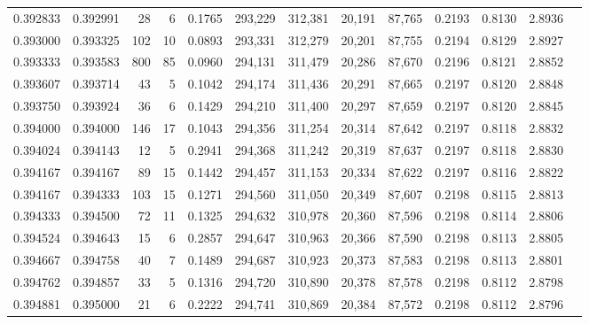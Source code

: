 \begin{tabular}{rrrrrrrrrrrrr}
0.392833 & 0.392991 &    28 &   6 &                                     0.1765 & 293,229 & 312,381 &  20,191 &  87,765 & 0.2193 & 0.8130 & 2.8936 \\
0.393000 & 0.393325 &   102 &  10 &                                     0.0893 & 293,331 & 312,279 &  20,201 &  87,755 & 0.2194 & 0.8129 & 2.8927 \\
0.393333 & 0.393583 &   800 &  85 &                                     0.0960 & 294,131 & 311,479 &  20,286 &  87,670 & 0.2196 & 0.8121 & 2.8852 \\
0.393607 & 0.393714 &    43 &   5 &                                     0.1042 & 294,174 & 311,436 &  20,291 &  87,665 & 0.2197 & 0.8120 & 2.8848 \\
0.393750 & 0.393924 &    36 &   6 &                                     0.1429 & 294,210 & 311,400 &  20,297 &  87,659 & 0.2197 & 0.8120 & 2.8845 \\
0.394000 & 0.394000 &   146 &  17 &                                     0.1043 & 294,356 & 311,254 &  20,314 &  87,642 & 0.2197 & 0.8118 & 2.8832 \\
0.394024 & 0.394143 &    12 &   5 &                                     0.2941 & 294,368 & 311,242 &  20,319 &  87,637 & 0.2197 & 0.8118 & 2.8830 \\
0.394167 & 0.394167 &    89 &  15 &                                     0.1442 & 294,457 & 311,153 &  20,334 &  87,622 & 0.2197 & 0.8116 & 2.8822 \\
0.394167 & 0.394333 &   103 &  15 &                                     0.1271 & 294,560 & 311,050 &  20,349 &  87,607 & 0.2198 & 0.8115 & 2.8813 \\
0.394333 & 0.394500 &    72 &  11 &                                     0.1325 & 294,632 & 310,978 &  20,360 &  87,596 & 0.2198 & 0.8114 & 2.8806 \\
0.394524 & 0.394643 &    15 &   6 &                                     0.2857 & 294,647 & 310,963 &  20,366 &  87,590 & 0.2198 & 0.8113 & 2.8805 \\
0.394667 & 0.394758 &    40 &   7 &                                     0.1489 & 294,687 & 310,923 &  20,373 &  87,583 & 0.2198 & 0.8113 & 2.8801 \\
0.394762 & 0.394857 &    33 &   5 &                                     0.1316 & 294,720 & 310,890 &  20,378 &  87,578 & 0.2198 & 0.8112 & 2.8798 \\
0.394881 & 0.395000 &    21 &   6 &                                     0.2222 & 294,741 & 310,869 &  20,384 &  87,572 & 0.2198 & 0.8112 & 2.8796 \\

\end{tabular}
